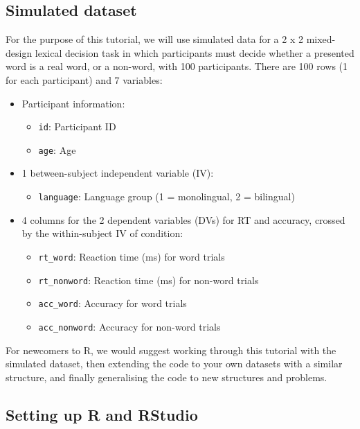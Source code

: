 \documentclass[
  english,
  doc,floatsintext]{apa6}
\providecommand{\tightlist}{%
  \setlength{\itemsep}{0pt}\setlength{\parskip}{0pt}}
\begin{document}
\hypertarget{simulated-dataset}{%
\subsection{Simulated dataset}\label{simulated-dataset}}

For the purpose of this tutorial, we will use simulated data for a 2 x 2 mixed-design lexical decision task in which participants must decide whether a presented word is a real word, or a non-word, with 100 participants. There are 100 rows (1 for each participant) and 7 variables:

\begin{itemize}
\item
  Participant information:

  \begin{itemize}
  \tightlist
  \item
    \texttt{id}: Participant ID
  \item
    \texttt{age}: Age
  \end{itemize}
\item
  1 between-subject independent variable (IV):

  \begin{itemize}
  \tightlist
  \item
    \texttt{language}: Language group (1 = monolingual, 2 = bilingual)
  \end{itemize}
\item
  4 columns for the 2 dependent variables (DVs) for RT and accuracy, crossed by the within-subject IV of condition:

  \begin{itemize}
  \tightlist
  \item
    \texttt{rt\_word}: Reaction time (ms) for word trials
  \item
    \texttt{rt\_nonword}: Reaction time (ms) for non-word trials
  \item
    \texttt{acc\_word}: Accuracy for word trials
  \item
    \texttt{acc\_nonword}: Accuracy for non-word trials
  \end{itemize}
\end{itemize}

For newcomers to R, we would suggest working through this tutorial with the simulated dataset, then extending the code to your own datasets with a similar structure, and finally generalising the code to new structures and problems.

\hypertarget{setting-up-r-and-rstudio}{%
\subsection{Setting up R and RStudio}\label{setting-up-r-and-rstudio}}
\end{document}
